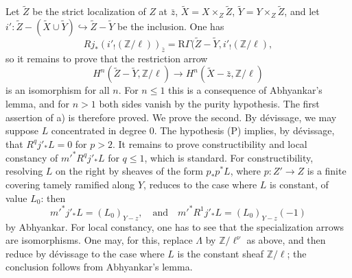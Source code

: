 \documentclass[11pt]{article}
\begin{document}
Let $\widetilde Z$ be the strict localization of $Z$ at $\bar z$, $\widetilde X=X\times_Z\widetilde Z$, $\widetilde Y=Y\times_Z\widetilde Z$, and let $i':\widetilde Z-(\widetilde X\cup\widetilde Y)\hookrightarrow \widetilde Z-\widetilde Y$ be the inclusion. One has
\[
Rj_*(i'_!(\mathbb Z/\ell))_{\bar z}
=\mathrm R\Gamma(\widetilde Z-\widetilde Y,i'_!(\mathbb Z/\ell),
\]
so it remains to prove that the restriction arrow
\[
H^n(\widetilde Z-\widetilde Y,\mathbb Z/\ell)
\longrightarrow
H^n(\widetilde X-\bar z,\mathbb Z/\ell)
\]
is an isomorphism for all $n$. For $n\le1$ this is a consequence of Abhyankar's lemma, and for $n>1$ both sides vanish by the purity hypothesis. The first assertion of a) is therefore proved. We prove the second. By dévissage, we may suppose $L$ concentrated in degree $0$. The hypothesis (P) implies, by dévissage, that $R^qj'_*L=0$ for $p>2$. It remains to prove constructibility and local constancy of $m'^*R^qj'_*L$ for $q\le1$, which is standard. For constructibility, resolving $L$ on the right by sheaves of the form $p_*p^*L$, where $p:Z'\to Z$ is a finite covering tamely ramified along $Y$, reduces to the case where $L$ is constant, of value $L_0$: then
\[
m'^*j'_*L=(L_0)_{Y-z},
\quad\text{and}\quad
m'^*R^1j'_*L=(L_0)_{Y-z}(-1)
\]
by Abhyankar. For local constancy, one has to see that the specialization arrows are isomorphisms. One may, for this, replace $\Lambda$ by $\mathbb Z/\ell^\nu$ as above, and then reduce by dévissage to the case where $L$ is the constant sheaf $\mathbb Z/\ell$; the conclusion follows from Abhyankar's lemma.
\end{document}
